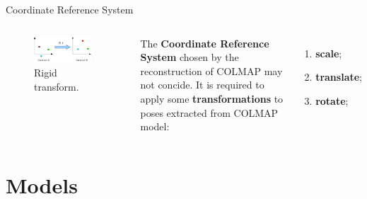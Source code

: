 \documentclass[
    center,
]{beamer}
\begin{document}
\begin{frame}{Coordinate Reference System}
    \begin{columns}
        \begin{figure}
            \centering
            \includegraphics[width=0.9\textwidth]{../imgs/rigid_trasform.png}
            \caption{Rigid transform.}
        \end{figure}

        The \textbf{Coordinate Reference System} chosen by the reconstruction of COLMAP may not concide. It is required to apply some \textbf{transformations} to poses extracted from COLMAP model:
        \begin{enumerate}
            \item \textbf{scale};
            \item \textbf{translate};
            \item \textbf{rotate};
        \end{enumerate}
    \end{columns}
\end{frame}

\section{Models}
\end{document}
